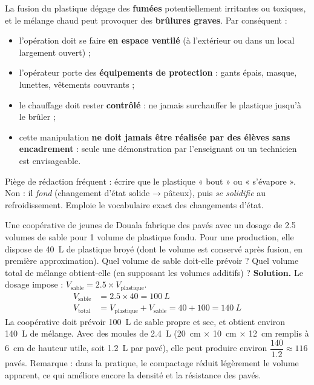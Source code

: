 \documentclass[11pt]{article}
\newcounter{popsec}
\newcounter{popsub}
\newcommand{\courssub}[1]{%
  \stepcounter{popsub}%
  \par\vspace{9pt}\noindent{\popxbold\fontsize{11.5}{13}\selectfont\color{popink}{\color{poporange}\thepopsec.\thepopsub}\hspace{6pt}#1}\par\nopagebreak\vspace{4pt}
}
\begin{document}
\courssub{Précautions et sécurité}

\begin{attention}
La fusion du plastique dégage des \textbf{fumées} potentiellement irritantes ou toxiques, et le mélange chaud peut provoquer des \textbf{brûlures graves}. Par conséquent :
\begin{itemize}
\item l'opération doit se faire \textbf{en espace ventilé} (à l'extérieur ou dans un local largement ouvert) ;
\item l'opérateur porte des \textbf{équipements de protection} : gants épais, masque, lunettes, vêtements couvrants ;
\item le chauffage doit rester \textbf{contrôlé} : ne jamais surchauffer le plastique jusqu'à le brûler ;
\item cette manipulation \textbf{ne doit jamais être réalisée par des élèves sans encadrement} : seule une démonstration par l'enseignant ou un technicien est envisageable.
\end{itemize}
Piège de rédaction fréquent : écrire que le plastique « bout » ou « s'évapore ». Non : il \emph{fond} (changement d'état solide → pâteux), puis \emph{se solidifie} au refroidissement. Emploie le vocabulaire exact des changements d'état.
\end{attention}

\begin{exoresolu}
Une coopérative de jeunes de Douala fabrique des pavés avec un dosage de \num{2,5} volumes de sable pour 1 volume de plastique fondu. Pour une production, elle dispose de \SI{40}{L} de plastique broyé (dont le volume est conservé après fusion, en première approximation). Quel volume de sable doit-elle prévoir ? Quel volume total de mélange obtient-elle (en supposant les volumes additifs) ?
\tcblower
\textbf{Solution.} Le dosage impose : $V_{\text{sable}} = \num{2,5} \times V_{\text{plastique}}$.
\begin{align*}
V_{\text{sable}} &= \num{2,5} \times 40 = \SI{100}{L}\\
V_{\text{total}} &= V_{\text{plastique}} + V_{\text{sable}} = 40 + 100 = \SI{140}{L}
\end{align*}
La coopérative doit prévoir \SI{100}{L} de sable propre et sec, et obtient environ \SI{140}{L} de mélange. Avec des moules de \SI{2,4}{L} (\SI{20}{cm} $\times$ \SI{10}{cm} $\times$ \SI{12}{cm} remplis à \SI{6}{cm} de hauteur utile, soit \SI{1,2}{L} par pavé), elle peut produire environ $\dfrac{140}{\num{1,2}} \approx 116$ pavés. Remarque : dans la pratique, le compactage réduit légèrement le volume apparent, ce qui améliore encore la densité et la résistance des pavés.
\end{exoresolu}
\end{document}
